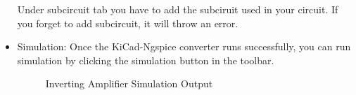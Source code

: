 \begin{itemize}
\pagebreak
Under subcircuit tab you have to add the subciruit used in your circuit. If you forget to add subcircuit, it will throw an error.\\


\item Simulation: Once the KiCad-Ngspice converter runs successfully, you can run simulation by clicking the simulation button in the toolbar.
\begin{figure}
    \centering
    \vfill
    \caption{Inverting Amplifier Simulation Output}
\end{figure}



\end{itemize}


\pagebreak

